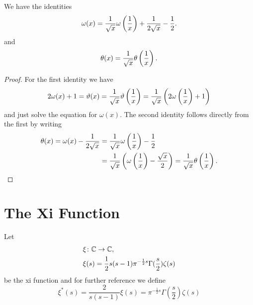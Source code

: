 \begin{corollary}\label{cor:ThetaIdentity}
	We have the identities
\begin{equation*}
	\omega(x) = \frac{1}{\sqrt{x}} \omega\left(\frac{1}{x}\right) + \frac{1}{2\sqrt{x}} - \frac{1}{2}.
\end{equation*}
	and
\begin{equation*}
	\theta(x) = \frac{1}{\sqrt{x}} \theta\left(\frac{1}{x}\right).
\end{equation*}
\end{corollary}
\begin{proof}
	For the first identity we have
\begin{equation*}
	2 \omega(x) + 1 = \vartheta(x) = \frac{1}{\sqrt{x}} \vartheta\left(\frac{1}{x}\right) = \frac{1}{\sqrt{x}} \left(2 \omega\left(\frac{1}{x}\right) + 1\right)
\end{equation*}
	and just solve the equation for $\omega(x)$. The second identity follows directly from the first by writing
\begin{equation*}
\begin{aligned}	
	\theta(x) = \omega(x) - \frac{1}{2 \sqrt{x}} 
	&= \frac{1}{\sqrt{x}} \omega\left(\frac{1}{x}\right) - \frac{1}{2} \\ 
	&= \frac{1}{\sqrt{x}} \left(\omega\left(\frac{1}{x}\right) - \frac{\sqrt{x}}{2}\right) = \frac{1}{\sqrt{x}} \theta\left(\frac{1}{x}\right).
\end{aligned}
\end{equation*}
\end{proof}


\section{The Xi Function}


\begin{definition}\label{def:XiDefinition}
	Let
\begin{equation*}
\begin{aligned}
	&\xi \colon \mathbb{C} \to \mathbb{C}, \\
	&\xi(s) = \frac{1}{2}s(s - 1) \pi ^{-\frac{1}{2} s} \Gamma(\frac{s}{2}) \zeta(s)
\end{aligned}
\end{equation*}
	be the xi function and for further reference we define
\begin{equation*}
	\xi^*(s) = \frac{2}{s(s - 1)} \xi(s) = \pi ^{-\frac{1}{2} s} \Gamma(\frac{s}{2}) \zeta(s)
\end{equation*}
\end{definition}


